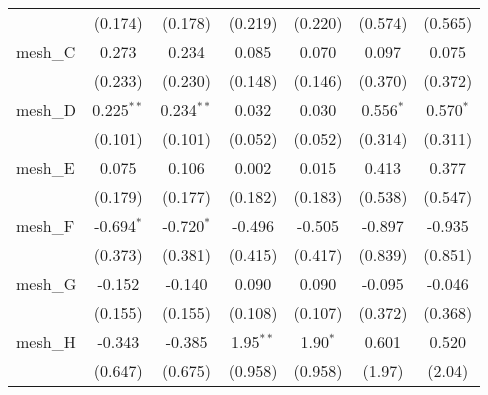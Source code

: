 \begin{tabular}{lcccccc}
                                                               & (0.174)        & (0.178)        & (0.219)        & (0.220)         & (0.574)      & (0.565)\\   
   mesh\_C                                                     & 0.273          & 0.234          & 0.085          & 0.070           & 0.097        & 0.075\\   
                                                               & (0.233)        & (0.230)        & (0.148)        & (0.146)         & (0.370)      & (0.372)\\   
   mesh\_D                                                     & 0.225$^{**}$   & 0.234$^{**}$   & 0.032          & 0.030           & 0.556$^{*}$  & 0.570$^{*}$\\   
                                                               & (0.101)        & (0.101)        & (0.052)        & (0.052)         & (0.314)      & (0.311)\\   
   mesh\_E                                                     & 0.075          & 0.106          & 0.002          & 0.015           & 0.413        & 0.377\\   
                                                               & (0.179)        & (0.177)        & (0.182)        & (0.183)         & (0.538)      & (0.547)\\   
   mesh\_F                                                     & -0.694$^{*}$   & -0.720$^{*}$   & -0.496         & -0.505          & -0.897       & -0.935\\   
                                                               & (0.373)        & (0.381)        & (0.415)        & (0.417)         & (0.839)      & (0.851)\\   
   mesh\_G                                                     & -0.152         & -0.140         & 0.090          & 0.090           & -0.095       & -0.046\\   
                                                               & (0.155)        & (0.155)        & (0.108)        & (0.107)         & (0.372)      & (0.368)\\   
   mesh\_H                                                     & -0.343         & -0.385         & 1.95$^{**}$    & 1.90$^{*}$      & 0.601        & 0.520\\   
                                                               & (0.647)        & (0.675)        & (0.958)        & (0.958)         & (1.97)       & (2.04)\\   

\end{tabular}
